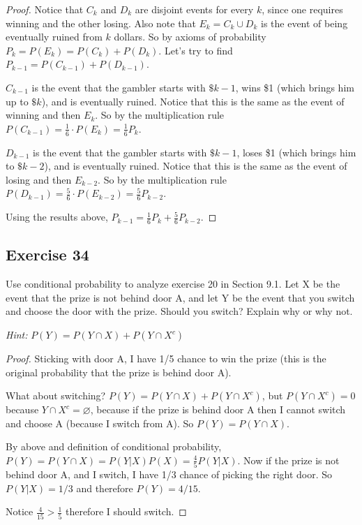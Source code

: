 \documentclass[14pt]{extarticle}
\newcommand{\es}{\varnothing}
\begin{document}
\begin{proof}
     Notice that \(C_k\) and \(D_k\) are disjoint events for every \(k\), since one requires winning and the other losing. Also
     note that \(E_k = C_k \cup D_k\) is the event of being eventually ruined from \(k\) dollars. So by axioms of
     probability \(P_k = P(E_k) = P(C_k) + P(D_k)\). Let's try to find \(P_{k-1} = P(C_{k-1}) + P(D_{k-1})\).

     \(C_{k-1}\) is the event that the gambler starts with \(\$k-1\), wins \$1 (which brings him up to \(\$k\)), and is
     eventually ruined. Notice that this is the same as the event of winning and then \(E_k\). So by the multiplication rule
     \(P(C_{k-1}) = \frac{1}{6} \cdot P(E_k) = \frac{1}{6}P_k\).

     \(D_{k-1}\) is the event that the gambler starts with \(\$k-1\), loses \$1 (which brings him to \(\$k-2\)), and is
     eventually ruined. Notice that this is the same as the event of losing and then \(E_{k-2}\). So by the multiplication rule
     \(P(D_{k-1}) = \frac{5}{6} \cdot P(E_{k-2}) = \frac{5}{6}P_{k-2}\).

     Using the results above, \(P_{k-1} = \frac{1}{6}P_k + \frac{5}{6}P_{k-2}\).
\end{proof}

\subsection{Exercise 34}
Use conditional probability to analyze exercise 20 in Section 9.1. Let X be the event that the prize is not behind door A,
and let Y be the event that you switch and choose the door with the prize. Should you switch? Explain why or why not.

     {\it Hint:} \(P(Y) = P(Y \cap X) + P(Y \cap X^c)\)

\begin{proof}
     Sticking with door A, I have 1/5 chance to win the prize (this is the original probability that the prize is behind door A).

     What about switching? \(P(Y) = P(Y \cap X) + P(Y \cap X^c)\), but \(P(Y \cap X^c) = 0\) because \(Y \cap X^c = \es\),
     because if the prize is behind door A then I cannot switch and choose A (because I switch from A). So \(P(Y) = P(Y \cap X)\).

     By above and definition of conditional probability, \(P(Y) = P(Y \cap X) = P(Y|X)P(X) = \frac{4}{5}P(Y|X)\). Now if the
     prize is not behind door A, and I switch, I have 1/3 chance of picking the right door. So \(P(Y|X) = 1/3\) and therefore
     \(P(Y) = 4/15\).

     Notice \(\frac{4}{15} > \frac{1}{5}\) therefore I should switch.
\end{proof}
\end{document}
